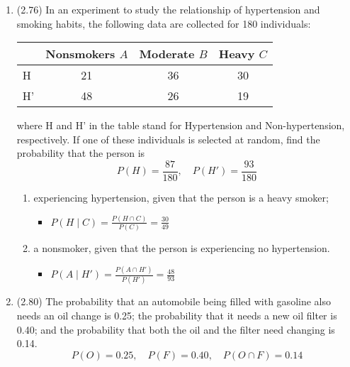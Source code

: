 \documentclass[basic, header]{nosvagor-notes} \usepackage{nosvagor-math}
\begin{document}
\begin{enumerate}[itemsep=8em]
\begin{enumerate}
\begin{itemize}
        \end{itemize}

    \end{enumerate}



  \item (2.76) In an experiment to study the relationship of hypertension
    and smoking habits, the following data are collected for 180 individuals:
    \begin{table}[h]
      \centering
      \begin{tabular}{lccc}
        \toprule
           & Nonsmokers \(A\) & Moderate \(B\) & Heavy \(C\) \\
        \midrule
        H  &         21 & 36       &    30 \\
        H' &         48 & 26       &    19 \\
        \bottomrule
      \end{tabular}
    \end{table}

    where H and H' in the table stand for Hypertension and Non-hypertension,
    respectively. If one of these individuals is selected at random, find the
    probability that the person is
    \[%
      P(H) = \frac{87}{180}, \quad P(H') = \frac{93}{180}
    \]%

    \begin{enumerate}
      \item experiencing hypertension, given that the person is a heavy smoker;
        \begin{itemize}
          \item \(\displaystyle P(H \mid C) = \frac{P(H\cap C)}{P(C)} = \frac{30}{49} \)

        \end{itemize}
      \item a nonsmoker, given that the person is experiencing no hypertension.
        \begin{itemize}
          \item \(\displaystyle P(A \mid H' ) = \frac{P(A \cap H')}{P(H')} = \frac{48}{93} \)

        \end{itemize}
    \end{enumerate}


  \item (2.80) The probability that an automobile being filled with
    gasoline also needs an oil change is 0.25; the probability that it needs
    a new oil filter is 0.40; and the probability that both the oil and the
    filter need changing is 0.14.
    \[%
      P(O) = 0.25, \quad P(F) = 0.40, \quad P(O \cap F) = 0.14
    \]%
    \begin{enumerate}


\end{enumerate}
\end{enumerate}
\end{document}
